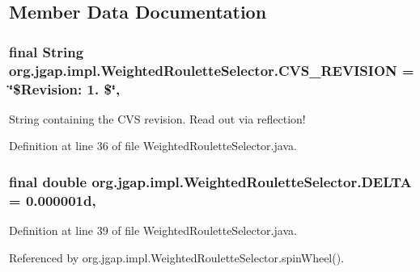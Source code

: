 \subsection{Member Data Documentation}
\hypertarget{classorg_1_1jgap_1_1impl_1_1_weighted_roulette_selector_ab462052fe73bae7036fa4f8625d5a2fc}{
\subsubsection[{C\-V\-S\-\_\-\-R\-E\-V\-I\-S\-I\-O\-N}]{\setlength{\rightskip}{0pt plus 5cm}final String org.\-jgap.\-impl.\-Weighted\-Roulette\-Selector.\-C\-V\-S\-\_\-\-R\-E\-V\-I\-S\-I\-O\-N = \char`\"{}\$Revision\-: 1. \$\char`\"{}\hspace{0.3cm}{\ttfamily [static]}, {\ttfamily [private]}}}\label{classorg_1_1jgap_1_1impl_1_1_weighted_roulette_selector_ab462052fe73bae7036fa4f8625d5a2fc}
String containing the C\-V\-S revision. Read out via reflection! 

Definition at line 36 of file Weighted\-Roulette\-Selector.\-java.

\hypertarget{classorg_1_1jgap_1_1impl_1_1_weighted_roulette_selector_aa0e65ef8a77636cbea4ece7a3bcacc71}{
\subsubsection[{D\-E\-L\-T\-A}]{\setlength{\rightskip}{0pt plus 5cm}final double org.\-jgap.\-impl.\-Weighted\-Roulette\-Selector.\-D\-E\-L\-T\-A = 0.\-000001d\hspace{0.3cm}{\ttfamily [static]}, {\ttfamily [private]}}}\label{classorg_1_1jgap_1_1impl_1_1_weighted_roulette_selector_aa0e65ef8a77636cbea4ece7a3bcacc71}


Definition at line 39 of file Weighted\-Roulette\-Selector.\-java.



Referenced by org.\-jgap.\-impl.\-Weighted\-Roulette\-Selector.\-spin\-Wheel().

